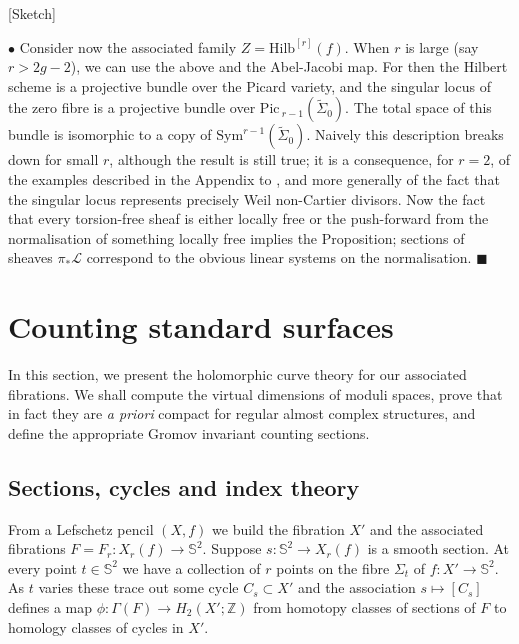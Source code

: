 \documentclass[10pt]{article}
\newcommand{\zz}{\mathbb{Z}}
\newcommand{\sss}{\mathbb{S}}
\newcommand{\Sym}{\mathrm{Sym}}
\newcommand{\Pic}{\mathrm{Pic \,}}
\newcommand{\Hilb}{\mathrm{Hilb}}
\newenvironment{Pf}{\par \noindent{\sc Proof:} }{\quad $\blacksquare$ \par
\vspace{0.5cm}}
\begin{document}
\begin{Pf}[Sketch]
\vspace{0.2cm}

\noindent $\bullet$ Consider now the
associated family $Z = \Hilb^{[r]}(f)$.  When $r$ is large (say
$r > 2g-2$), we can use 
the above and the Abel-Jacobi map.  For then the Hilbert scheme is a
projective bundle over the Picard variety, and the singular locus of
the zero fibre is a projective bundle over $\Pic_{r-1}
(\tilde{\Sigma}_0)$.  The total space of
this bundle is isomorphic to a copy of $\Sym^{r-1}
(\tilde{\Sigma}_0)$.  Naively
this description breaks down for small $r$, although the
result is still true;  it is a consequence, for $r=2$, of the examples
described in the Appendix to \cite{SKDIS}, and more generally of the
fact that the singular locus represents precisely Weil non-Cartier
divisors.  Now the fact that every torsion-free sheaf is either
locally free or the push-forward from the normalisation of something
locally free implies the Proposition; sections of sheaves $\pi_*
\mathcal{L}$ correspond to the obvious linear systems on the
normalisation. 
\end{Pf}


\section{Counting standard surfaces}

In this section, we present the holomorphic curve theory for our
associated fibrations.  We shall compute the virtual dimensions of
moduli spaces, prove that in fact they are \emph{a priori} compact for
regular almost complex structures, and
define the appropriate Gromov invariant counting sections.


\subsection{Sections, cycles and index theory}

From a Lefschetz pencil $(X,f)$ we build the fibration $X'$ and the
associated fibrations $F = F_r: X_r(f) \rightarrow \sss^2$.
Suppose $s: \sss^2 \rightarrow X_r(f)$ is a smooth section.
At every point $t \in \sss^2$ we have a collection of $r$ points on
the fibre $\Sigma_t$ of $f: X' \rightarrow \sss^2$.  As $t$ varies
these trace out some cycle $C_s \subset X'$ and the association $s
\mapsto [C_s]$ defines a map $\phi: \Gamma(F) \rightarrow H_2 (X';
\zz)$ from homotopy classes of sections of $F$ to homology classes of
cycles in $X'$.  
\end{document}
